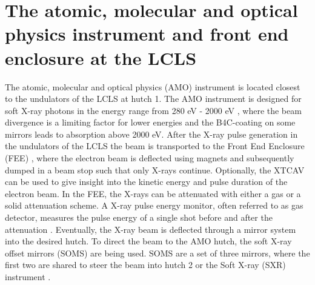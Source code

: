 \section[The AMO instrument and FEE at the LCLS]{The atomic, molecular and optical physics instrument and front end enclosure at the LCLS}\label{sec:amo-instrument}
The atomic, molecular and optical physics (AMO) instrument is located closest to the undulators of the LCLS at hutch 1. The AMO instrument is designed for soft X-ray photons in the energy range from 280 eV - 2000 eV \citep{Ferguson-2015-JSR,Bozek-2009-EPJST}, where the beam divergence is a limiting factor for lower energies and the B4C-coating on some mirrors leads to absorption above 2000 eV. After the X-ray pulse generation in the undulators of the LCLS the beam is transported to the Front End Enclosure (FEE) \citep{Moeller-2011-NIMPR}, where the electron beam is deflected using magnets and subsequently dumped in a beam stop such that only X-rays continue. Optionally, the XTCAV \citep{Behrens-2014-NatCom} can be used to give insight into the kinetic energy and pulse duration of the electron beam. In the FEE, the X-rays can be attenuated with either a gas or a solid attenuation scheme. A X-ray pulse energy monitor, often referred to as gas detector, measures the pulse energy of a single shot before and after the attenuation \citep{Hau-Riege-2010-PRL-2}. Eventually, the X-ray beam is deflected through a mirror system into the desired hutch. To direct the beam to the AMO hutch, the soft X-ray offset mirrors (SOMS) are being used. SOMS are a set of three mirrors, where the first two are shared to steer the beam into hutch 2 or the Soft X-ray (SXR) instrument \citep{Schlotter-2012-RSI,Soufli-2012-AppOpt,Dakovski-2015-JSR}.
